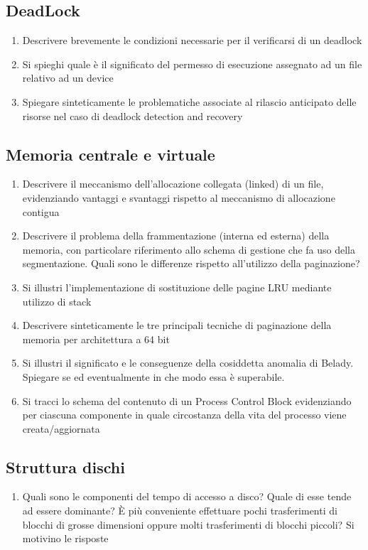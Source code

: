 \documentclass{report}
\begin{document}
\subsection{DeadLock}
\begin{enumerate}
    \item Descrivere brevemente le condizioni necessarie per il verificarsi di un deadlock
    \item Si spieghi quale è il significato del permesso di esecuzione assegnato ad un file relativo ad un device
    \item Spiegare sinteticamente le problematiche associate al rilascio anticipato delle risorse nel caso di
deadlock detection and recovery
\end{enumerate}

\subsection{Memoria centrale e virtuale}
\begin{enumerate}
    \item Descrivere il meccanismo dell’allocazione collegata (linked) di un file, evidenziando vantaggi e
svantaggi rispetto al meccanismo di allocazione contigua
\item Descrivere il problema della frammentazione (interna ed esterna) della memoria, con particolare
riferimento allo schema di gestione che fa uso della segmentazione.
Quali sono le differenze rispetto all’utilizzo della paginazione?
\item Si illustri l’implementazione di sostituzione delle pagine LRU mediante utilizzo di stack
\item Descrivere sinteticamente le tre principali tecniche di paginazione della memoria per architettura a 64 bit
\item Si illustri il significato e le conseguenze della cosiddetta anomalia di Belady. Spiegare se ed eventualmente in che modo essa è superabile.
\item Si tracci lo schema del contenuto di un Process Control Block evidenziando per ciascuna componente in quale circostanza della vita del processo viene creata/aggiornata
\end{enumerate}
\subsection{Struttura dischi}
\begin{enumerate}
    \item Quali sono le componenti del tempo di accesso a disco? Quale di esse tende ad essere dominante? È più conveniente effettuare pochi trasferimenti di blocchi di grosse dimensioni
oppure molti trasferimenti di blocchi piccoli? Si motivino le risposte
\end{enumerate}
\end{document}
